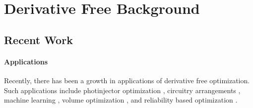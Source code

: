 \section{Derivative Free Background}
% 
% 
% 

\subsection{Recent Work}
\paragraph{Applications}
Recently, there has been a growth in applications of derivative free optimization.
Such applications include photinjector optimization \cite{1742-6596-874-1-012062}, circuitry arrangements \cite{PLOSKAS201816}, machine learning \cite{KS2018}, volume optimization \cite{Cheng2017}, and reliability based optimization \cite{Gao2017}.


